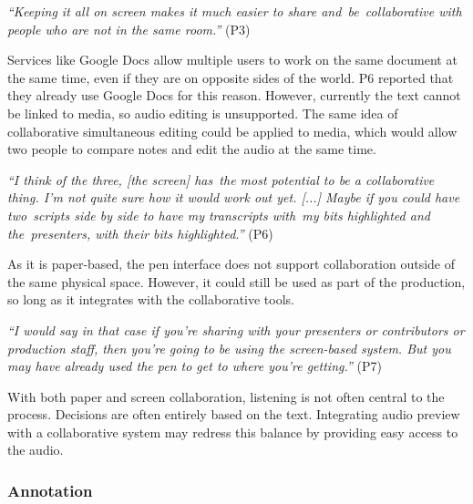 \textit{``Keeping it all on screen makes it much easier to share and be collaborative with people who are not in the
same room.''} (P3)

Services like Google Docs allow multiple users to work on the same document at the same time, even if they are on
opposite sides of the world. P6 reported that they already use Google Docs for this reason. However, currently the text
cannot be linked to media, so audio editing is unsupported. The same idea of collaborative simultaneous editing could
be applied to media, which would allow two people to compare notes and edit the audio at the same time.

\textit{``I think of the three, [the screen] has the most potential to be a collaborative thing. I'm not quite sure how
  it would work out yet. [...]
  Maybe if you could have two scripts side by side to have my transcripts with my bits highlighted and the presenters,
with their bits highlighted.''} (P6)

As it is paper-based, the pen interface does not support collaboration outside of the same physical space. However,
it could still be used as part of the production, so long as it integrates with the collaborative tools.

\textit{``I would say in that case if you're sharing with your presenters or contributors or production staff, then
  you're going to be using the screen-based system. But you may have already used the pen to get to where you're
getting.''} (P7)


With both paper and screen collaboration, listening is not often central to the process. Decisions are often entirely
based on the text. Integrating audio preview with a collaborative system may redress this balance by providing easy
access to the audio.

\subsubsection{Annotation}


